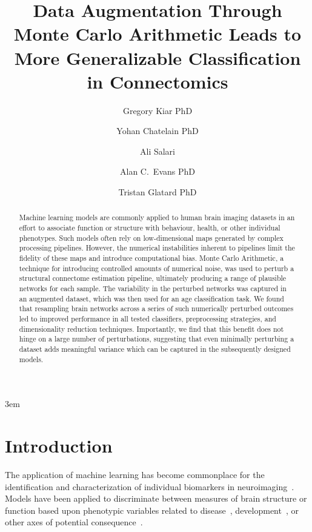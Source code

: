 \documentclass[num-refs]{nbdt-article}
\title{Data Augmentation Through Monte Carlo Arithmetic Leads to More Generalizable Classification in Connectomics}
\author[1\authfn{2}]{Gregory Kiar PhD}
\author[2]{Yohan Chatelain PhD}
\author[2]{Ali Salari}
\author[1]{Alan C.~Evans PhD}
\author[2]{Tristan Glatard PhD}
\affil[1]{Montreal Neurological Institute, McGill University, Montreal, QC, H3A 2B4, Canada}
\affil[2]{Department of Computer Science and Computer Engineering, Concordia University, Montreal, QC, H3G 1M8, Canada}
\begin{document}
\emergencystretch 3em

\maketitle

\begin{abstract}
Machine learning models are commonly applied to human brain imaging datasets in an effort to associate function or structure with behaviour, health, or other individual phenotypes. Such models often rely on low-dimensional maps generated by complex processing pipelines. However, the numerical instabilities inherent to pipelines limit the fidelity of these maps and introduce computational bias. Monte Carlo Arithmetic, a technique for introducing controlled amounts of numerical noise, was used to perturb a structural connectome estimation pipeline, ultimately producing a range of plausible networks for each sample. The variability in the perturbed networks was captured in an augmented dataset, which was then used for an age classification task. We found that resampling brain networks across a series of such numerically perturbed outcomes led to improved performance in all tested classifiers, preprocessing strategies, and dimensionality reduction techniques. Importantly, we find that this benefit does not hinge on a large number of perturbations, suggesting that even minimally perturbing a dataset adds meaningful variance which can be captured in the subsequently designed models.

\end{abstract}

\section{Introduction}
The application of machine learning has become commonplace for the identification and characterization of individual biomarkers in neuroimaging~\cite{woo2017building}. Models have been applied to discriminate between measures of brain structure or function based upon phenotypic variables related to disease~\cite{Crossley2014-tg,Payabvash2019-tm,Tolan2018-nq}, development~\cite{Zhang2019-ko}, or other axes of potential consequence~\cite{Zhu2018-cs,Park2015-uj}.
\end{document}
